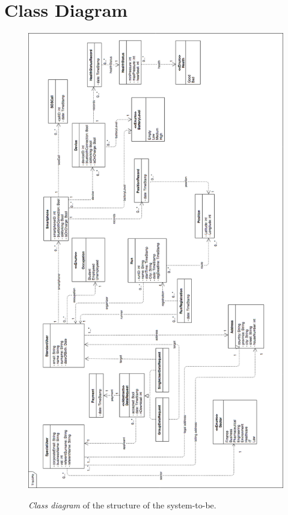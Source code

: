 \section{Class Diagram}
\begin{figure}[H]
  \begin{center}
  	\includegraphics[width=\textwidth,height=0.60\paperheight]{./img/Class_Diagram.png}
		\caption{\textit{Class diagram} of the structure of the system-to-be.}
    \hspace{0.05\linewidth}
    \centering
		\label{img:classDiagram}
    \end{center}
\end{figure}
